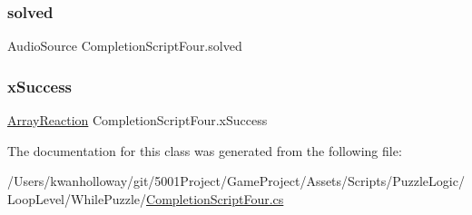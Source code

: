 \mbox{\label{class_completion_script_four_ac78527b696de4ff5992bec7fef332014}} 
\subsubsection{\texorpdfstring{solved}{solved}}
{\footnotesize\ttfamily Audio\+Source Completion\+Script\+Four.\+solved}

\mbox{\label{class_completion_script_four_a747aafbf72eb507c388cb72ad6911b13}} 
\subsubsection{\texorpdfstring{x\+Success}{xSuccess}}
{\footnotesize\ttfamily \hyperlink{class_array_reaction}{Array\+Reaction} Completion\+Script\+Four.\+x\+Success}



The documentation for this class was generated from the following file\+:\begin{DoxyCompactItemize}
\item 
/\+Users/kwanholloway/git/5001\+Project/\+Game\+Project/\+Assets/\+Scripts/\+Puzzle\+Logic/\+Loop\+Level/\+While\+Puzzle/\hyperlink{_completion_script_four_8cs}{Completion\+Script\+Four.\+cs}\end{DoxyCompactItemize}
